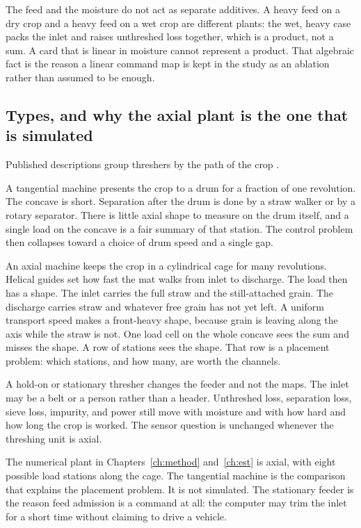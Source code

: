 The feed and the moisture do not act as separate additives. A heavy feed on a dry crop and a heavy feed on a wet crop are different plants: the wet, heavy case packs the inlet and raises unthreshed loss together, which is a product, not a sum. A card that is linear in moisture cannot represent a product. That algebraic fact is the reason a linear command map is kept in the study as an ablation rather than assumed to be enough.

\subsection{Types, and why the axial plant is the one that is simulated}

Published descriptions group threshers by the path of the crop \cite{srivastava2006,kepner1978,fu2018}.

A tangential machine presents the crop to a drum for a fraction of one revolution. The concave is short. Separation after the drum is done by a straw walker or by a rotary separator. There is little axial shape to measure on the drum itself, and a single load on the concave is a fair summary of that station. The control problem then collapses toward a choice of drum speed and a single gap.

An axial machine keeps the crop in a cylindrical cage for many revolutions. Helical guides set how fast the mat walks from inlet to discharge. The load then has a shape. The inlet carries the full straw and the still-attached grain. The discharge carries straw and whatever free grain has not yet left. A uniform transport speed makes a front-heavy shape, because grain is leaving along the axis while the straw is not. One load cell on the whole concave sees the sum and misses the shape. A row of stations sees the shape. That row is a placement problem: which stations, and how many, are worth the channels.

A hold-on or stationary thresher changes the feeder and not the maps. The inlet may be a belt or a person rather than a header. Unthreshed loss, separation loss, sieve loss, impurity, and power still move with moisture and with how hard and how long the crop is worked. The sensor question is unchanged whenever the threshing unit is axial.

The numerical plant in Chapters~\ref{ch:method} and~\ref{ch:est} is axial, with eight possible load stations along the cage. The tangential machine is the comparison that explains the placement problem. It is not simulated. The stationary feeder is the reason feed admission is a command at all: the computer may trim the inlet for a short time without claiming to drive a vehicle.

